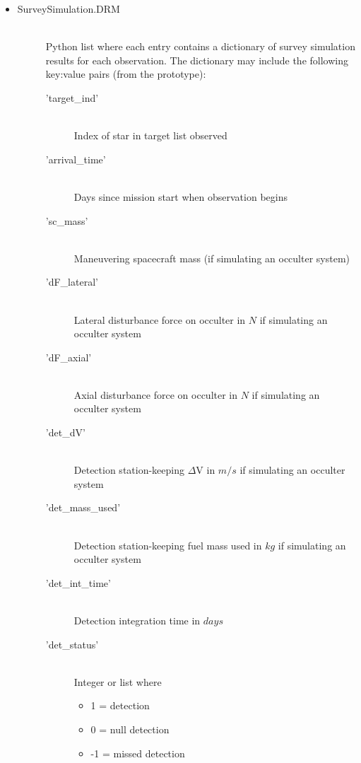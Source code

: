 \documentclass[cleanfoot]{asme2ej}
\begin{document}
\begin{itemize}
    \item 
    \begin{description}
        \item[SurveySimulation.DRM] \hfill \\
        Python list where each entry contains a dictionary of survey simulation results for each observation.  The dictionary may include the following key:value pairs (from the prototype):
        \begin{description}
            \item['target\_ind'] \hfill \\
            Index of star in target list observed
            \item['arrival\_time'] \hfill \\
            Days since mission start when observation begins
            \item['sc\_mass'] \hfill \\
            Maneuvering spacecraft mass (if simulating an occulter system)
            \item['dF\_lateral'] \hfill \\
            Lateral disturbance force on occulter in $ N $ if simulating an occulter system
            \item['dF\_axial'] \hfill \\
            Axial disturbance force on occulter in $ N $ if simulating an occulter system
            \item['det\_dV'] \hfill \\
            Detection station-keeping $\Delta$V in $ m/s $ if simulating an occulter system
            \item['det\_mass\_used'] \hfill \\
            Detection station-keeping fuel mass used in $ kg $ if simulating an occulter system
            \item['det\_int\_time'] \hfill \\
            Detection integration time in $ days $
            \item['det\_status'] \hfill \\
            Integer or list where
            \begin{itemize}
                \item 1 = detection
                \item 0 = null detection
                \item -1 = missed detection

\end{itemize}
\end{description}
\end{description}
\end{itemize}
\end{document}
